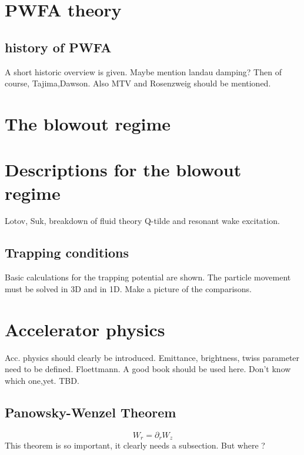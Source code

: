 \section{PWFA theory}
\subsection{history of PWFA}
A short historic overview is given. 
Maybe mention landau damping? Then of course, Tajima,Dawson. Also MTV and Rosenzweig should be mentioned.

\section{The blowout regime}

\section{Descriptions for the blowout regime}
Lotov, Suk, breakdown of fluid theory
Q-tilde and resonant wake excitation.
\subsection{Trapping conditions}
Basic calculations for the trapping potential are shown.
The particle movement must be solved in 3D and in 1D. Make a picture of the comparisons.


\section{Accelerator physics}
Acc. physics should clearly be introduced. Emittance, brightness, twiss parameter need to be defined. Floettmann. A good book should be used here. Don't know which one,yet. TBD.
\subsection{Panowsky-Wenzel Theorem}
 \begin{equation}
W_r =\partial_r W_z
\end{equation} 
This theorem is so important, it clearly needs a subsection. But where ?


